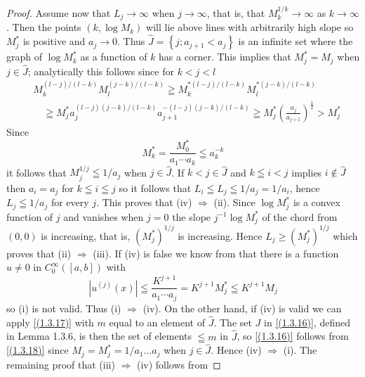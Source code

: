 \begin{proof}
Assume now that $L_{j} \rightarrow \infty$ when $j \rightarrow \infty$, that is, that $M_{k}^{1 / k} \rightarrow \infty$ as $k \rightarrow \infty$. Then the points $\left(k, \log M_{k}\right)$ will lie above lines with arbitrarily high slope so $M_{j}^{*}$ is positive and $a_{j} \rightarrow 0$. Thus $\hat{J}=\left\{j ; a_{j+1}<a_{j}\right\}$ is an infinite set where the graph of $\log M_{k}^{*}$ as a function of $k$ has a corner. This implies that $M_{j}^{*}=M_{j}$ when $j \in \hat{J}$; analytically this follows since for $k<j<l$
\[
	\begin{aligned}
		 & M_{k}^{(l-j) /(l-k)} M_{l}^{(j-k) /(l-k)} \geqq M_{k}^{*(l-j) /(l-k)} M_{l}^{*(j-k) /(l-k)}                                                      \\
		 & \quad \geqq M_{j}^{*} a_{j}^{(l-j)(j-k) /(l-k)} a_{j+1}^{-(l-j)(j-k) /(l-k)} \geqq M_{j}^{*}\left(\frac{a_{j}}{a_{j+1}}\right)^{\frac{1}{2}}>M_{j}^{*}
	\end{aligned}
\]
Since
\[
	M_{k}^{*}= \frac{M_{0}^{*}}{a_{1} \cdots a_{k}}  \leqq a_{k}^{-k}
\]
it follows that $M_{j}^{1 / j} \leqq 1 / a_{j}$ when $j \in \widehat{J}$. If $k<j \in \widehat{J}$ and $k \leqq i<j$ implies $i \notin \hat{J}$ then $a_{i}=a_{j}$ for $k \leqq i \leqq j$ so it follows that $L_{i} \leqq L_{j} \leqq 1 / a_{j}=1 / a_{i}$, hence
$L_{j} \leqq 1 / a_{j}$ for every $j$. This proves that (iv) $\Rightarrow$ (ii). Since $\log M_{j}^{*}$ is a convex function of $j$ and vanishes when $j=0$ the slope $j^{-1} \log M_{j}^{*}$ of the chord from $(0,0)$ is increasing, that is, $\left(M_{j}^{*}\right)^{1 / j}$ is increasing. Hence $L_{j} \geq\left(M_{j}^{*}\right)^{1 / j}$ which proves that (ii) $\Rightarrow$ (iii). If (iv) is false we know from  that there is a function $u \neq 0$ in $C_{0}^{\infty}([a, b])$ with
\[
	\left|u^{(j)}(x)\right| \leqq \frac{K^{j+1}}{a_{1} \cdots a_{j}} =K^{j+1} M_{j}^{*} \leqq K^{j+1} M_{j}
\]
so (i) is not valid. Thus (i) $\Rightarrow$ (iv). On the other hand, if (iv) is valid we can apply \eqref{(1.3.17)} with $m$ equal to an element of $\hat{J}$. The set $J$ in \eqref{(1.3.16)}, defined in Lemma 1.3.6, is then the set of elements $\leqq m$ in $\hat{J}$, so \eqref{(1.3.16)} follows from \eqref{(1.3.18)} since $M_{j}=M_{j}^{*}=1 / a_{1} \ldots a_{j}$ when $j \in \hat{J}$. Hence (iv) $\Rightarrow$ (i). The remaining proof that (iii) $\Rightarrow$ (iv) follows from


\end{proof}
